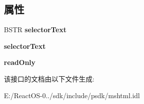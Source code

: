 \subsection*{属性}
\begin{DoxyCompactItemize}
\item 
\mbox{\label{interface_m_s_h_t_m_l_1_1_disp_h_t_m_l_style_sheet_rule_a6aaa7f742b4ff7d3fce0a2c588908774}} 
B\+S\+TR {\bfseries selector\+Text}
\item 
\mbox{\label{interface_m_s_h_t_m_l_1_1_disp_h_t_m_l_style_sheet_rule_a540d3b232f7cbb55944233ab168372e5}} 
{\bfseries selector\+Text}
\item 
\mbox{\label{interface_m_s_h_t_m_l_1_1_disp_h_t_m_l_style_sheet_rule_a23a0511e26c6771fd91b984258f71e6c}} 
{\bfseries read\+Only}
\end{DoxyCompactItemize}


该接口的文档由以下文件生成\+:\begin{DoxyCompactItemize}
\item 
E\+:/\+React\+O\+S-\/0../sdk/include/psdk/mshtml.\+idl\end{DoxyCompactItemize}
